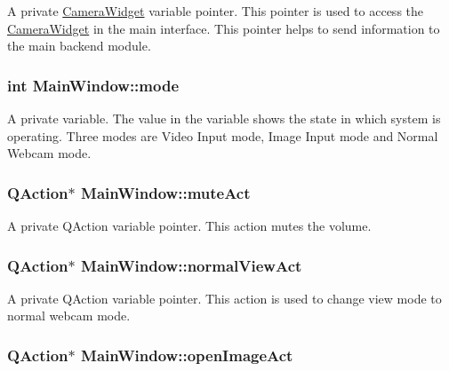 \label{classMainWindow_a8a71bdff27e71941a425a96a795443b5}
A private \hyperlink{classCameraWidget}{CameraWidget} variable pointer. This pointer is used to access the \hyperlink{classCameraWidget}{CameraWidget} in the main interface. This pointer helps to send information to the main backend module. \hypertarget{classMainWindow_a0d680234c97ecdc151020dd0ec09cc54}{
\subsubsection[{mode}]{\setlength{\rightskip}{0pt plus 5cm}int {\bf MainWindow::mode}}}
\label{classMainWindow_a0d680234c97ecdc151020dd0ec09cc54}
A private variable. The value in the variable shows the state in which system is operating. Three modes are Video Input mode, Image Input mode and Normal Webcam mode. \hypertarget{classMainWindow_a4d55df68e5f3e8dd26107c16bab31269}{
\subsubsection[{muteAct}]{\setlength{\rightskip}{0pt plus 5cm}QAction$\ast$ {\bf MainWindow::muteAct}}}
\label{classMainWindow_a4d55df68e5f3e8dd26107c16bab31269}
A private QAction variable pointer. This action mutes the volume. \hypertarget{classMainWindow_add80706af3d1f3bc4cfa7580b0cbea6d}{
\subsubsection[{normalViewAct}]{\setlength{\rightskip}{0pt plus 5cm}QAction$\ast$ {\bf MainWindow::normalViewAct}}}
\label{classMainWindow_add80706af3d1f3bc4cfa7580b0cbea6d}
A private QAction variable pointer. This action is used to change view mode to normal webcam mode. \hypertarget{classMainWindow_af702728ef74d0f2d63d0149f9a92a576}{
\subsubsection[{openImageAct}]{\setlength{\rightskip}{0pt plus 5cm}QAction$\ast$ {\bf MainWindow::openImageAct}}}
